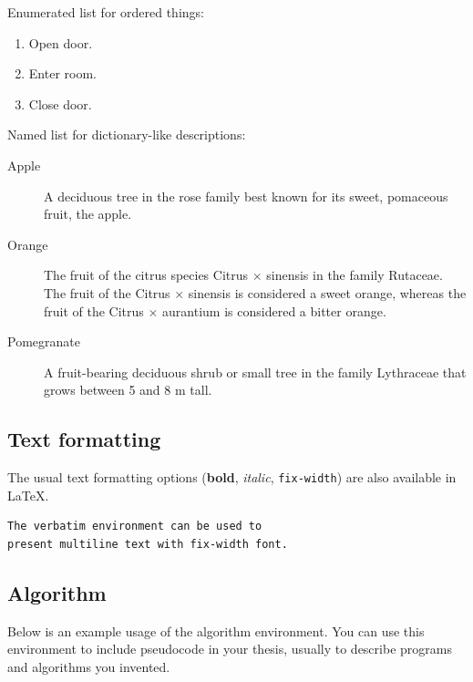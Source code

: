 Enumerated list for ordered things:
\begin{enumerate}
\item Open door.
\item Enter room.
\item Close door. 
\end{enumerate}

Named list for dictionary-like descriptions:
\begin{description}
\item[Apple] A deciduous tree in the rose family best known for its sweet, pomaceous fruit, the apple.
\item[Orange] The fruit of the citrus species Citrus $\times$ sinensis in the family Rutaceae. The fruit of the Citrus $\times$ sinensis is considered a sweet orange, whereas the fruit of the Citrus $\times$ aurantium is considered a bitter orange.
\item[Pomegranate] A fruit-bearing deciduous shrub or small tree in the family Lythraceae that grows between 5 and 8 m tall.
\end{description}

\subsection{Text formatting}
The usual text formatting options (\textbf{bold}, \textit{italic}, \texttt{fix-width}) are also available in \LaTeX. 
\begin{verbatim}
The verbatim environment can be used to
present multiline text with fix-width font.
\end{verbatim}

\clearpage
\subsection{Algorithm}
Below is an example usage of the algorithm environment. You can use this environment to include pseudocode in your thesis, usually to describe programs and algorithms you invented.


